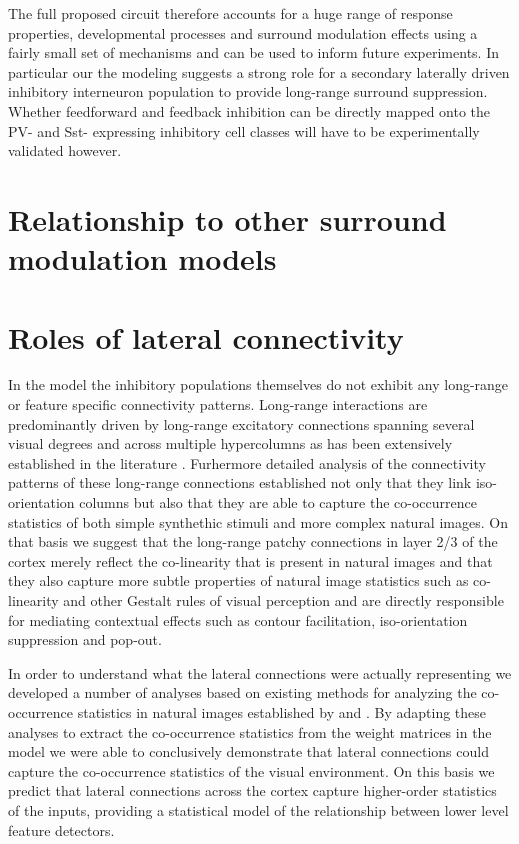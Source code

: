 The full proposed circuit therefore accounts for a huge range of
response properties, developmental processes and surround modulation
effects using a fairly small set of mechanisms and can be used to
inform future experiments. In particular our the modeling suggests a
strong role for a secondary laterally driven inhibitory interneuron
population to provide long-range surround suppression. Whether
feedforward and feedback inhibition can be directly mapped onto the
PV- and Sst- expressing inhibitory cell classes will have to be
experimentally validated however.

\section{Relationship to other surround modulation models}


\section{Roles of lateral connectivity}

In the model the inhibitory populations themselves do not exhibit any
long-range or feature specific connectivity patterns. Long-range
interactions are predominantly driven by long-range excitatory
connections spanning several visual degrees and across multiple
hypercolumns as has been extensively established in the literature
\citep{Weliky1995, Bair2003}. Furhermore detailed analysis of the
connectivity patterns of these long-range connections established not
only that they link iso-orientation columns but also that they are
able to capture the co-occurrence statistics of both simple synthethic
stimuli and more complex natural images. On that basis we suggest that
the long-range patchy connections in layer 2/3 of the cortex merely
reflect the co-linearity that is present in natural images and that
they also capture more subtle properties of natural image statistics
such as co-linearity and other Gestalt rules of visual perception and
are directly responsible for mediating contextual effects such as
contour facilitation, iso-orientation suppression and pop-out.

In order to understand what the lateral connections were actually
representing we developed a number of analyses based on existing
methods for analyzing the co-occurrence statistics in natural images
established by \cite{Geisler2001} and \cite{Perrinet2015}. By adapting
these analyses to extract the co-occurrence statistics from the weight
matrices in the model we were able to conclusively demonstrate that
lateral connections could capture the co-occurrence statistics of the
visual environment. On this basis we predict that lateral connections
across the cortex capture higher-order statistics of the inputs,
providing a statistical model of the relationship between lower level
feature detectors.

